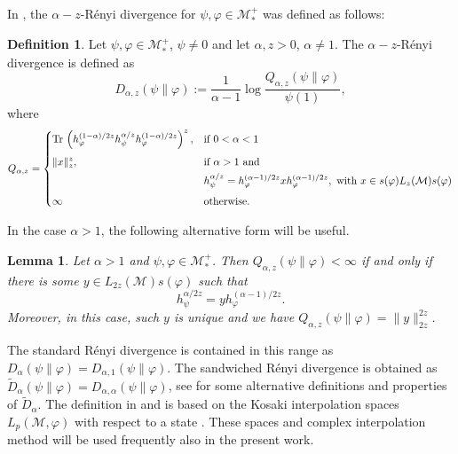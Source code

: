 \documentclass[12pt]{article}
\newtheorem{lemma}{Lemma}
\theoremstyle{definition}
\newtheorem{defi}{Definition}
\theoremstyle{remark}
\def\Me{\mathcal M}
\def \Tr{\mathrm{Tr}\,}
\begin{document}
In \cite{kato2023aremark, kato2023onrenyi}, the
$\alpha-z$-R\'enyi divergence for $\psi,\varphi\in \mathcal M_*^+$  was defined as
follows: 
\begin{defi}\label{defi:renyi} Let $\psi,\varphi\in \Me_*^+$, $\psi\ne 0$ and let
$\alpha,z>0$, $\alpha\ne 1$. The $\alpha-z$-R\'enyi divergence is defined as 
\[
D_{\alpha,z}(\psi\|\varphi):=\frac1{\alpha-1}\log
\frac{Q_{\alpha,z}(\psi\|\varphi)}{\psi(1)},
\]
where 
\[
Q_{\alpha,z}=\begin{dcases} \Tr
\left(h_\varphi^{(1-\alpha)/2z}h_\psi^{\alpha/z}h_\varphi^{(1-\alpha)/2z}\right)^z, &
\text{if } 0<\alpha<1\\[0.3em]
\|x\|_z^z, & \text{if } \alpha>1 \text{ and }\\
\ & h_\psi^{\alpha/z}=h_\varphi^{(\alpha-1)/2z}xh_\varphi^{(\alpha-1)/2z},\text{ with }
x\in s(\varphi)L_z(\Me)s(\varphi)\\[0.3em]
\infty& \text{otherwise}.
\end{dcases}
\]
\end{defi}


In the case $\alpha>1$, the following alternative form will be useful.

\begin{lemma}\cite{kato2023onrenyi} \label{lemma:renyi_2z}
Let $\alpha>1$ and $\psi,\varphi\in \Me_*^+$. Then $Q_{\alpha,z}(\psi\|\varphi)<\infty$ if
and only if there is some $y\in L_{2z}(\Me)s(\varphi)$ such that 
\[
h_\psi^{\alpha/2z}=yh_\varphi^{(\alpha-1)/2z}.
\]
Moreover, in this case, such $y$ is unique and we have
$Q_{\alpha,z}(\psi\|\varphi)=\|y\|_{2z}^{2z}$. 
\end{lemma}

The standard R\'enyi divergence \cite{petz1985quasi, hiai2018quantum, hiai2021quantum} is
contained in this range as $D_\alpha(\psi\|\varphi)=D_{\alpha,1}(\psi\|\varphi)$. The
sandwiched R\'enyi divergence  is obtained as $\tilde
D_\alpha(\psi\|\varphi)=D_{\alpha,\alpha}(\psi\|\varphi)$, see
\cite{berta2018renyi,hiai2021quantum,jencova2018renyi, jencova2021renyi} for some
alternative definitions and properties of $\tilde D_\alpha$. The definition in
\cite{jencova2018renyi} and \cite{jencova2021renyi} is based on the Kosaki interpolation
spaces  $L_p(\Me,\varphi)$ with respect to a state \cite{kosaki1986applications}. These spaces and
complex interpolation method will be used frequently also in the present work. 
\end{document}
